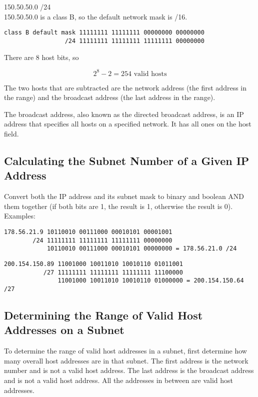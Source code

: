 150.50.50.0 /24\\

150.50.50.0 is a class B, so the default network mask is /16.

\begin{verbatim}
class B default mask 11111111 11111111 00000000 00000000
                 /24 11111111 11111111 11111111 00000000
\end{verbatim}

There are 8 host bits, so

\begin{equation}
2 ^ 8 - 2 = 254 \mbox{ valid hosts}
\end{equation}

The two hosts that are subtracted are the network address (the first address in
the range) and the broadcast address (the last address in the range).

The broadcast address, also known as the directed broadcast address, is an IP
address that specifies all hosts on a specified network. It has all ones on the
host field.

\subsection{Calculating the Subnet Number of a Given IP Address}

Convert both the IP address and its subnet mask to binary and boolean AND
them together (if both bits are 1, the result is 1, otherwise the result is
0).\\

Examples:

\begin{verbatim}
178.56.21.9 10110010 00111000 00010101 00001001
        /24 11111111 11111111 11111111 00000000
            10110010 00111000 00010101 00000000 = 178.56.21.0 /24
\end{verbatim}

\begin{verbatim}
200.154.150.89 11001000 10011010 10010110 01011001
           /27 11111111 11111111 11111111 11100000
               11001000 10011010 10010110 01000000 = 200.154.150.64 /27
\end{verbatim}

\subsection{Determining the Range of Valid Host Addresses on a Subnet}

To determine the range of valid host addresses in a subnet, first determine
how many overall host addresses are in that subnet. The first address is the
network number and is not a valid host address. The last address is the
broadcast address and is not a valid host address. All the addresses in
between are valid host addresses.\\

